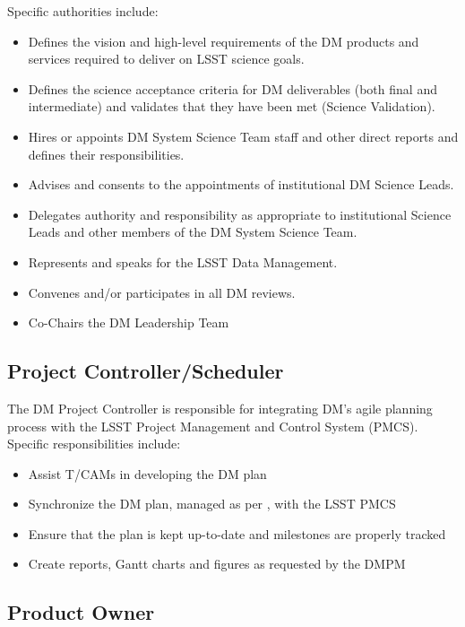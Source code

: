 Specific authorities include:

\begin{itemize}
\item Defines the vision and high-level requirements of the DM products and services required to deliver on LSST science goals.
\item Defines the science acceptance criteria for DM deliverables (both final and intermediate) and validates that they have been met (Science Validation).
\item Hires or appoints DM System Science Team staff and other direct reports and defines their responsibilities.
\item Advises and consents to the appointments of institutional DM Science Leads.
\item Delegates authority and responsibility as appropriate to institutional Science Leads and other members of the DM System Science Team.
\item Represents and speaks for the LSST Data Management.
\item Convenes and/or participates in all DM reviews.
\item Co-Chairs the DM Leadership Team
\end{itemize}

\subsection{Project Controller/Scheduler \label{role:pcon}}

The DM Project Controller is responsible for integrating DM's agile planning process with the LSST Project Management and Control System (PMCS). Specific responsibilities include:

\begin{itemize}

  \item{Assist T/CAMs in developing the DM plan}
  \item{Synchronize the DM plan, managed as per , with the LSST PMCS}
  \item{Ensure that the plan is kept up-to-date and milestones are properly tracked}
  \item{Create reports, Gantt charts and figures as requested by the DMPM}

\end{itemize}

\subsection{Product Owner \label{role:prodo}}

